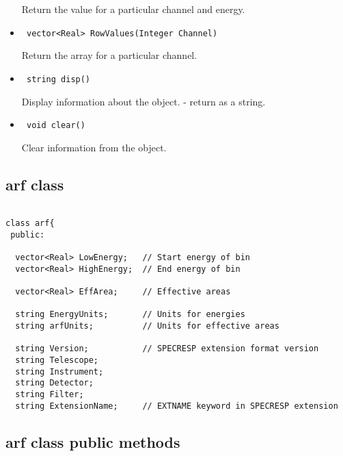 \documentclass[11pt]{book}
\begin{document}
\begin{itemize}
          Return the value for a particular channel and energy.

\item  \begin{verbatim} vector<Real> RowValues(Integer Channel) \end{verbatim}

          Return the array for a particular channel.

\item  \begin{verbatim} string disp() \end{verbatim}

          Display information about the object. - return as a string.

\item  \begin{verbatim} void clear() \end{verbatim}

          Clear information from the object.

\end{itemize}


\subsection{arf class}


\begin{verbatim}

class arf{
 public:

  vector<Real> LowEnergy;   // Start energy of bin
  vector<Real> HighEnergy;  // End energy of bin

  vector<Real> EffArea;     // Effective areas

  string EnergyUnits;       // Units for energies
  string arfUnits;          // Units for effective areas

  string Version;           // SPECRESP extension format version
  string Telescope;                             
  string Instrument;
  string Detector;
  string Filter;
  string ExtensionName;     // EXTNAME keyword in SPECRESP extension

\end{verbatim}


\subsection{arf class public methods}
\end{document}
